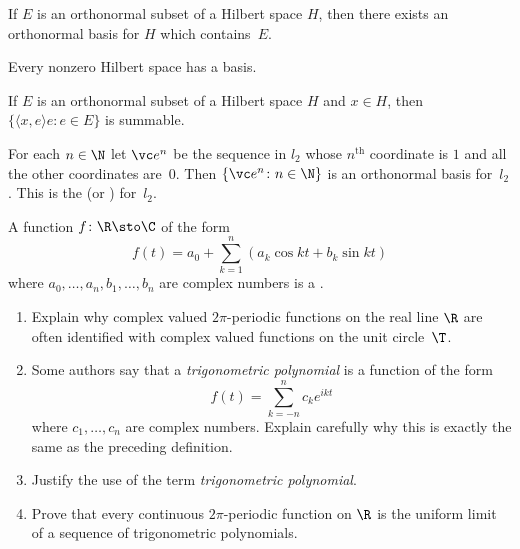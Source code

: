 \begin{prop} If $E$ is an orthonormal subset of a Hilbert space $H$, then there exists an
orthonormal basis for $H$ which contains~$E$.
\end{prop}

\begin{cor} Every nonzero Hilbert space has a basis.
\end{cor}

\begin{prop}  If $E$ is an orthonormal subset of a Hilbert space $H$ and $x \in H$, then
$\{\langle x,e \rangle e: e \in E\}$ is summable.
\end{prop}

\begin{exam}\label{C063149} For each $n \in \N$ let $\vc e^n$ be the sequence in $l_2$ whose
$n^{\text{th}}$ coordinate is $1$ and all the other coordinates are~$0$. Then $\{\vc e^n\colon n \in \N\}$
is an orthonormal basis for~$l_2$.  This is the
 (or
)  for~$l_2$.
\end{exam}

\begin{exer} A function $f\colon \R \sto \C$ of the form
   \[ f(t) = a_0 + \sum_{k=1}^n (a_k \cos kt + b_k \sin kt) \]
where $a_0, \dots, a_n, b_1, \dots, b_n$ are complex numbers is a
.
 \begin{enumerate}
  \item Explain why complex valued $2\pi$-periodic functions on the real line $\R$ are
often identified with complex valued functions on the unit circle~$\T$.
  \item Some authors say that a \emph{trigonometric polynomial} is a function of the form
    \[ f(t) = \sum_{k=-n}^n c_k e^{ikt} \]
where $c_1, \dots, c_n$ are complex numbers. Explain carefully why this is exactly the
same as the preceding definition.
  \item Justify the use of the term \emph{trigonometric polynomial}.
  \item Prove that every continuous $2\pi$-periodic function on $\R$ is the uniform limit
of a sequence of trigonometric polynomials.
 \end{enumerate}
\end{exer}

